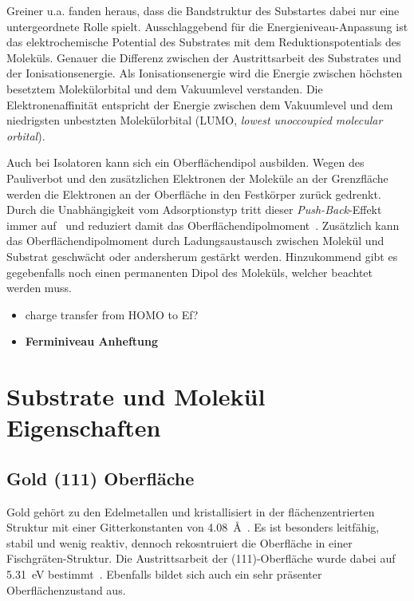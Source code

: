             Greiner u.a. \cite{IF_3} fanden heraus, dass die Bandstruktur des Substartes dabei nur eine untergeordnete Rolle spielt.
            Ausschlaggebend für die Energieniveau-Anpassung ist das elektrochemische Potential des Substrates mit dem Reduktionspotentials des Moleküls.
            Genauer die Differenz zwischen der Austrittsarbeit des Substrates und der Ionisationsenergie.
            Als Ionisationsenergie wird die Energie zwischen höchsten besetztem Molekülorbital und dem Vakuumlevel verstanden.
            Die Elektronenaffinität entspricht der Energie zwischen dem Vakuumlevel und dem niedrigsten unbestzten Molekülorbital (LUMO, \textit{lowest unoccoupied molecular orbital}).

            Auch bei Isolatoren kann sich ein Oberflächendipol ausbilden.
            Wegen des Pauliverbot und den zusätzlichen Elektronen der Moleküle an der Grenzfläche werden die Elektronen an der Oberfläche in den Festkörper zurück gedrenkt.
            Durch die Unabhängigkeit vom Adsorptionstyp tritt dieser \textit{Push-Back}-Effekt immer auf~\cite{IF_4} und reduziert damit das Oberflächendipolmoment~\cite{IF_1}.
            Zusätzlich kann das Oberflächendipolmoment durch Ladungsaustausch zwischen Molekül und Substrat geschwächt oder andersherum gestärkt werden.
            Hinzukommend gibt es gegebenfalls noch einen permanenten Dipol des Moleküls, welcher beachtet werden muss.

            \begin{itemize}
                \item charge transfer from HOMO to Ef? \cite{IF_4}
                \item \textbf{Ferminiveau Anheftung}
            \end{itemize}


    \section{Substrate und Molekül Eigenschaften}
        \subsection{Gold (111) Oberfläche}
            Gold gehört zu den Edelmetallen und kristallisiert in der flächenzentrierten Struktur mit einer Gitterkonstanten von \SI{4.08}{\angstrom}~\cite{Marx}.
            Es ist besonders leitfähig, stabil und wenig reaktiv, dennoch rekosntruiert die Oberfläche in einer Fischgräten-Struktur.
            Die Austrittsarbeit der (111)-Oberfläche wurde dabei auf \SI{5.31}{\electronvolt} bestimmt~\cite{Hüfner}.
            Ebenfalls bildet sich auch ein sehr präsenter Oberflächenzustand aus.
            
